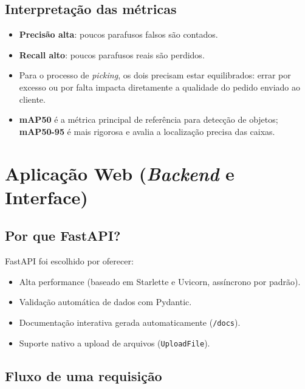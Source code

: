 \documentclass[12pt,a4paper]{article}
\begin{document}
\subsection{Interpreta\c{c}\~ao das m\'etricas}

\begin{itemize}[leftmargin=*]
  \item \textbf{Precis\~ao alta}: poucos parafusos falsos s\~ao contados.
  \item \textbf{Recall alto}: poucos parafusos reais s\~ao perdidos.
  \item Para o processo de \emph{picking}, os dois precisam estar equilibrados: errar
        por excesso ou por falta impacta diretamente a qualidade do pedido enviado ao cliente.
  \item \textbf{mAP50} \'e a m\'etrica principal de refer\^encia para detec\c{c}\~ao
        de objetos; \textbf{mAP50-95} \'e mais rigorosa e avalia a localiza\c{c}\~ao
        precisa das caixas.
\end{itemize}

\section{Aplica\c{c}\~ao Web (\emph{Backend} e Interface)}

\subsection{Por que FastAPI?}

FastAPI foi escolhido por oferecer:
\begin{itemize}[leftmargin=*]
  \item Alta performance (baseado em Starlette e Uvicorn, ass\'incrono por padr\~ao).
  \item Valida\c{c}\~ao autom\'atica de dados com Pydantic.
  \item Documenta\c{c}\~ao interativa gerada automaticamente (\texttt{/docs}).
  \item Suporte nativo a upload de arquivos (\texttt{UploadFile}).
\end{itemize}

\subsection{Fluxo de uma requisi\c{c}\~ao}
\end{document}
